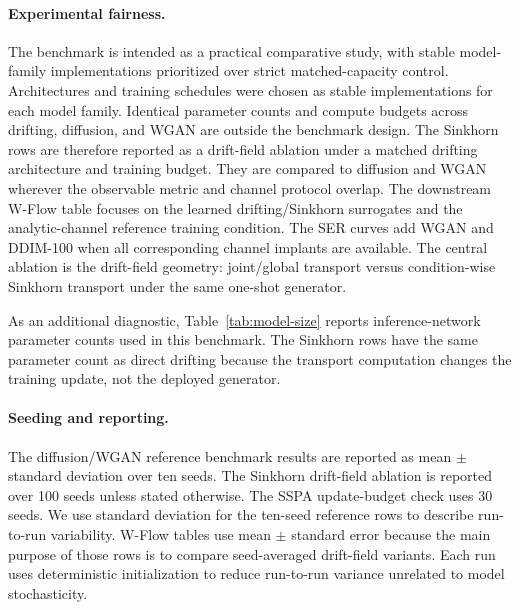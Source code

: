 \documentclass[10pt,journal]{IEEEtran}
\begin{document}
\paragraph{Experimental fairness.}
The benchmark is intended as a practical comparative study, with stable model-family implementations prioritized over strict matched-capacity control.
Architectures and training schedules were chosen as stable implementations for each model family.
Identical parameter counts and compute budgets across drifting, diffusion, and WGAN are outside the benchmark design.
The Sinkhorn rows are therefore reported as a drift-field ablation under a matched drifting architecture and training budget.
They are compared to diffusion and WGAN wherever the observable metric and channel protocol overlap.
The downstream W-Flow table focuses on the learned drifting/Sinkhorn surrogates and the analytic-channel reference training condition.
The SER curves add WGAN and DDIM-100 when all corresponding channel implants are available.
The central ablation is the drift-field geometry: joint/global transport versus condition-wise Sinkhorn transport under the same one-shot generator.

As an additional diagnostic, Table~\ref{tab:model-size} reports inference-network parameter counts used in this benchmark.
The Sinkhorn rows have the same parameter count as direct drifting because the transport computation changes the training update, not the deployed generator.


\paragraph{Seeding and reporting.}
  The diffusion/WGAN reference benchmark results are reported as mean \(\pm\) standard deviation over ten seeds.
  The Sinkhorn drift-field ablation is reported over 100 seeds unless stated otherwise. The SSPA update-budget check uses 30 seeds.
  We use standard deviation for the ten-seed reference rows to describe run-to-run variability.
  W-Flow tables use mean \(\pm\) standard error because the main purpose of those rows is to compare seed-averaged drift-field variants.
  Each run uses deterministic initialization to reduce run-to-run variance unrelated to model stochasticity.
\end{document}
